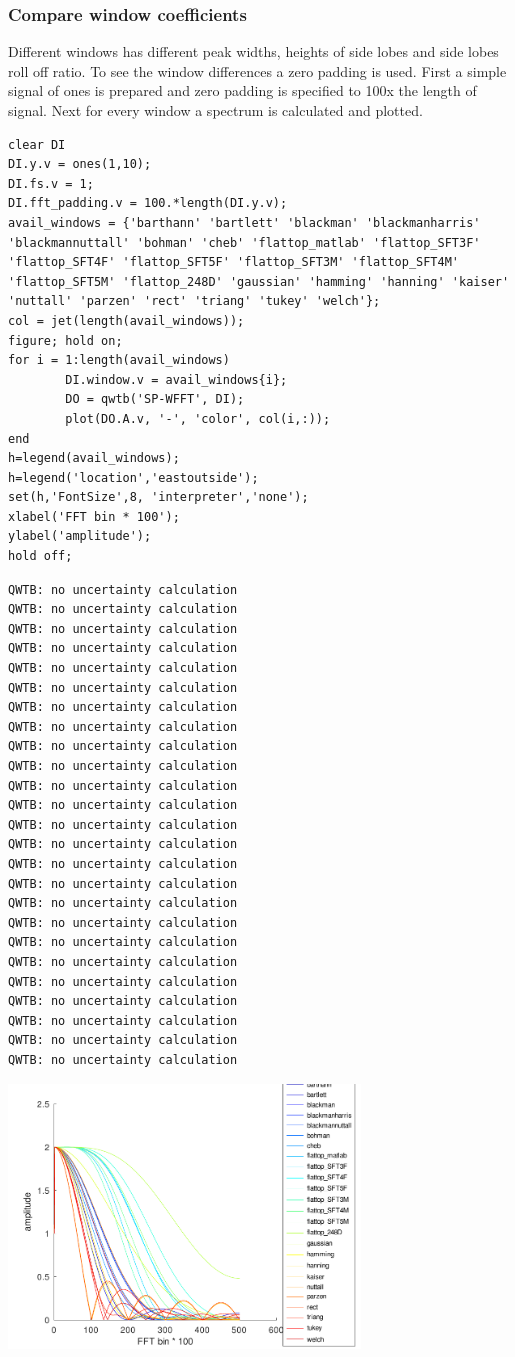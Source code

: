 {}
\subsubsection*{Compare window coefficients}



Different windows has different peak widths, heights of side lobes and side lobes
roll off ratio. To see the window differences a zero padding is used.
First a simple signal of ones is prepared and zero padding is specified to 100x the length of
signal. Next for every window a spectrum is calculated and plotted.

\begin{lstlisting}
clear DI
DI.y.v = ones(1,10);
DI.fs.v = 1;
DI.fft_padding.v = 100.*length(DI.y.v);
avail_windows = {'barthann' 'bartlett' 'blackman' 'blackmanharris' 'blackmannuttall' 'bohman' 'cheb' 'flattop_matlab' 'flattop_SFT3F' 'flattop_SFT4F' 'flattop_SFT5F' 'flattop_SFT3M' 'flattop_SFT4M' 'flattop_SFT5M' 'flattop_248D' 'gaussian' 'hamming' 'hanning' 'kaiser' 'nuttall' 'parzen' 'rect' 'triang' 'tukey' 'welch'};
col = jet(length(avail_windows));
figure; hold on;
for i = 1:length(avail_windows)
        DI.window.v = avail_windows{i};
        DO = qwtb('SP-WFFT', DI);
        plot(DO.A.v, '-', 'color', col(i,:));
end
h=legend(avail_windows);
h=legend('location','eastoutside');
set(h,'FontSize',8, 'interpreter','none');
xlabel('FFT bin * 100');
ylabel('amplitude');
hold off;
\end{lstlisting}
\begin{lstlisting}[language={},xleftmargin=5pt,frame=none]
QWTB: no uncertainty calculation
QWTB: no uncertainty calculation
QWTB: no uncertainty calculation
QWTB: no uncertainty calculation
QWTB: no uncertainty calculation
QWTB: no uncertainty calculation
QWTB: no uncertainty calculation
QWTB: no uncertainty calculation
QWTB: no uncertainty calculation
QWTB: no uncertainty calculation
QWTB: no uncertainty calculation
QWTB: no uncertainty calculation
QWTB: no uncertainty calculation
QWTB: no uncertainty calculation
QWTB: no uncertainty calculation
QWTB: no uncertainty calculation
QWTB: no uncertainty calculation
QWTB: no uncertainty calculation
QWTB: no uncertainty calculation
QWTB: no uncertainty calculation
QWTB: no uncertainty calculation
QWTB: no uncertainty calculation
QWTB: no uncertainty calculation
QWTB: no uncertainty calculation
QWTB: no uncertainty calculation

\end{lstlisting}
\begin{center}
\includegraphics[width=0.7\textwidth]{algs_examples_published/SP-WFFT_alg_example-3.pdf}
\end{center}


\stopcontents[localtoc]
